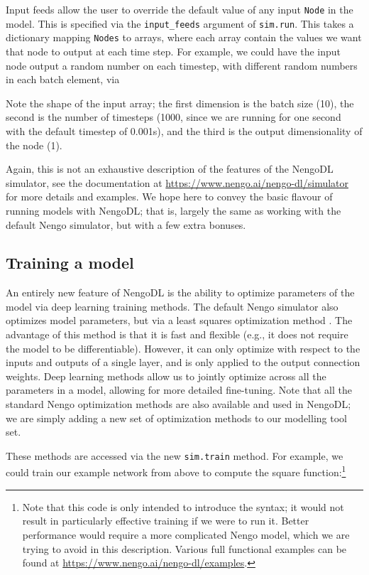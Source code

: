 \documentclass{article}
\begin{document}
Input feeds allow the user to override the default value of any input \texttt{Node} in the model.  This is specified via the \texttt{input\_feeds} argument of \texttt{sim.run}.  This takes a dictionary mapping \texttt{Nodes} to arrays, where each array contain the values we want that node to output at each time step.  For example, we could have the input node output a random number on each timestep, with different random numbers in each batch element, via



Note the shape of the input array; the first dimension is the batch size (10), the second is the number of timesteps (1000, since we are running for one second with the default timestep of 0.001s), and the third is the output dimensionality of the node (1).

Again, this is not an exhaustive description of the features of the NengoDL simulator, see the documentation at \url{https://www.nengo.ai/nengo-dl/simulator} for more details and examples.  We hope here to convey the basic flavour of running models with NengoDL; that is, largely the same as working with the default Nengo simulator, but with a few extra bonuses.

\subsection{Training a model}

An entirely new feature of NengoDL is the ability to optimize parameters of the model via deep learning training methods.  The default Nengo simulator also optimizes model parameters, but via a least squares optimization method \citep{Eliasmith2003}.  The advantage of this method is that it is fast and flexible (e.g., it does not require the model to be differentiable).  However, it can only optimize with respect to the inputs and outputs of a single layer, and is only applied to the output connection weights.  Deep learning methods allow us to jointly optimize across all the parameters in a model, allowing for more detailed fine-tuning.  Note that all the standard Nengo optimization methods are also available and used in NengoDL; we are simply adding a new set of optimization methods to our modelling tool set.

These methods are accessed via the new \texttt{sim.train} method.  For example, we could train our example network from above to compute the square function:\footnote{Note that this code is only intended to introduce the syntax; it would not result in particularly effective training if we were to run it.  Better performance would require a more complicated Nengo model, which we are trying to avoid in this description.  Various full functional examples can be found at \url{https://www.nengo.ai/nengo-dl/examples}.}
\end{document}
